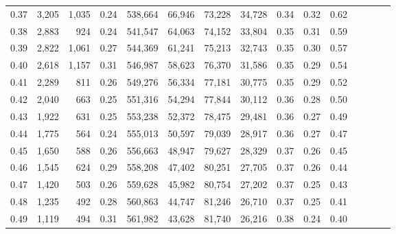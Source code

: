 \begin{tabular}{rrrcrrrrrrrrrrr}
0.37 &   3,205 &  1,035 &                                       0.24 &  538,664 &   66,946 &   73,228 &   34,728 &  0.34 &  0.32 &                         0.62 \\
0.38 &   2,883 &    924 &                                       0.24 &  541,547 &   64,063 &   74,152 &   33,804 &  0.35 &  0.31 &                         0.59 \\
0.39 &   2,822 &  1,061 &                                       0.27 &  544,369 &   61,241 &   75,213 &   32,743 &  0.35 &  0.30 &                         0.57 \\
0.40 &   2,618 &  1,157 &                                       0.31 &  546,987 &   58,623 &   76,370 &   31,586 &  0.35 &  0.29 &                         0.54 \\
0.41 &   2,289 &    811 &                                       0.26 &  549,276 &   56,334 &   77,181 &   30,775 &  0.35 &  0.29 &                         0.52 \\
0.42 &   2,040 &    663 &                                       0.25 &  551,316 &   54,294 &   77,844 &   30,112 &  0.36 &  0.28 &                         0.50 \\
0.43 &   1,922 &    631 &                                       0.25 &  553,238 &   52,372 &   78,475 &   29,481 &  0.36 &  0.27 &                         0.49 \\
0.44 &   1,775 &    564 &                                       0.24 &  555,013 &   50,597 &   79,039 &   28,917 &  0.36 &  0.27 &                         0.47 \\
0.45 &   1,650 &    588 &                                       0.26 &  556,663 &   48,947 &   79,627 &   28,329 &  0.37 &  0.26 &                         0.45 \\
0.46 &   1,545 &    624 &                                       0.29 &  558,208 &   47,402 &   80,251 &   27,705 &  0.37 &  0.26 &                         0.44 \\
0.47 &   1,420 &    503 &                                       0.26 &  559,628 &   45,982 &   80,754 &   27,202 &  0.37 &  0.25 &                         0.43 \\
0.48 &   1,235 &    492 &                                       0.28 &  560,863 &   44,747 &   81,246 &   26,710 &  0.37 &  0.25 &                         0.41 \\
0.49 &   1,119 &    494 &                                       0.31 &  561,982 &   43,628 &   81,740 &   26,216 &  0.38 &  0.24 &                         0.40 \\

\end{tabular}
